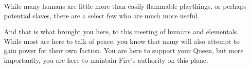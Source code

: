 \documentclass[char]{elementals}
\begin{document}
While many humans are little more than easily flammable playthings, or perhaps potential slaves, there are a select few who are much more useful.  


And that is what brought you here, to this meeting of humans and elementals.  While most are here to talk of peace, you know that many will also attempt to gain power for their own faction.  You are here to support your Queen, but more importantly, you are here to maintain Fire's authority on this plane.
\end{document}

